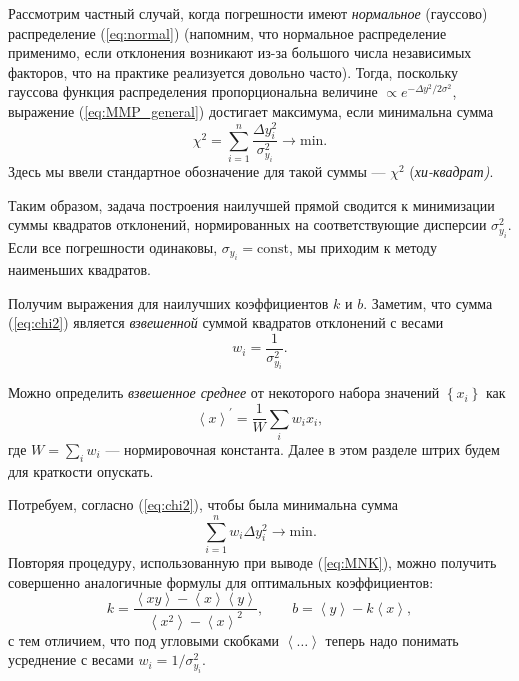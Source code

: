 Рассмотрим частный случай, когда погрешности имеют \emph{нормальное}
(гауссово) распределение (\ref{eq:normal}) (напомним, что нормальное
распределение применимо, если отклонения возникают из-за большого
числа независимых факторов, что на практике реализуется довольно часто).
Тогда, поскольку гауссова функция распределения пропорциональна величине
$\propto e^{-\Delta y^{2}/2\sigma^{2}}$, выражение (\ref{eq:MMP_general})
достигает максимума, если минимальна сумма
\begin{equation}
\boxed{\chi^{2}=\sum_{i=1}^{n}\frac{\Delta y_{i}^{2}}{\sigma_{y_{i}}^{2}}\to\mathrm{min}}.\label{eq:chi2}
\end{equation}
Здесь мы ввели стандартное обозначение для такой суммы ---
$\chi^{2}$ (\emph{хи-квадрат)}.

Таким образом, задача построения наилучшей прямой сводится
к минимизации суммы квадратов отклонений, нормированных на соответствующие
дисперсии $\sigma_{y_{i}}^{2}$. Если все погрешности одинаковы, $\sigma_{y_{i}}=\mathrm{const}$,
мы приходим к методу наименьших квадратов.

Получим выражения для наилучших коэффициентов $k$ и $b$.
Заметим, что сумма (\ref{eq:chi2}) является \emph{взвешенной}
суммой квадратов отклонений с весами
\begin{equation}
w_{i}=\frac{1}{\sigma_{y_{i}}^{2}}.
\end{equation}

Можно определить \emph{взвешенное среднее} от
некоторого набора значений $\left\{ x_{i}\right\}$ как
\[
\left\langle x\right\rangle ^{\prime}=\frac{1}{W}\sum_{i}w_{i}x_{i},
\]
где $W=\sum\limits _{i}w_{i}$ --- нормировочная константа.
Далее в этом разделе штрих будем для краткости опускать.

Потребуем, согласно (\ref{eq:chi2}), чтобы была минимальна
сумма
\[
\sum\limits _{i=1}^{n}w_{i}\Delta y_{i}^{2}\to\mathrm{min}.
\]
Повторяя процедуру, использованную при выводе (\ref{eq:MNK}), можно
получить совершенно аналогичные формулы для оптимальных коэффициентов:
\begin{equation}
\boxed{k=\frac{\left\langle xy\right\rangle -\left\langle x\right\rangle \left\langle y\right\rangle }{\left\langle x^{2}\right\rangle -\left\langle x\right\rangle ^{2}},\qquad b=\left\langle y\right\rangle -k\left\langle x\right\rangle },\label{eq:MMP}
\end{equation}
с тем отличием, что под угловыми скобками $\left\langle \ldots\right\rangle $
теперь надо понимать усреднение с весами $w_{i}=1/\sigma_{y_{i}}^{2}$.

